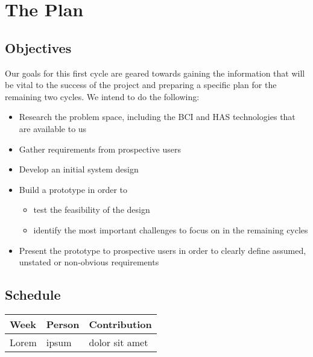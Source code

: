 \documentclass{report}
\begin{document}
\newpage
\section*{\centering The Plan}

\subsection*{Objectives}

Our goals for this first cycle are geared towards gaining the information that
will be vital to the success of the project and preparing a specific plan for
the remaining two cycles. We intend to do the following:
\begin{itemize}
    \item Research the problem space, including the BCI and HAS technologies
        that are available to us
    \item Gather requirements from prospective users
    \item Develop an initial system design
    \item Build a prototype in order to
        \begin{itemize}
            \item test the feasibility of the design
            \item identify the most important challenges to focus on in the
                remaining cycles
        \end{itemize}
    \item Present the prototype to prospective users in order to clearly
        define assumed, unstated or non-obvious requirements
\end{itemize}

\subsection*{Schedule}

\begin{tabular}{| l | l | l |}
    \hline
    Week & Person & Contribution \\
    \hline \hline
    Lorem & ipsum & dolor sit amet \\ \hline
\end{tabular}
\end{document}
